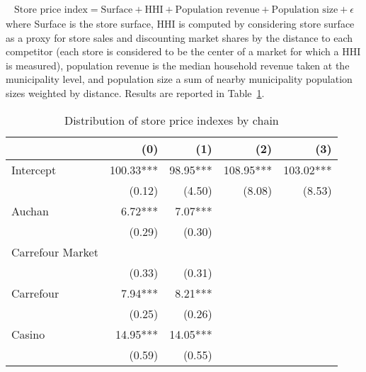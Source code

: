 \documentclass[english]{article}
\begin{document}
\begin{align}
\text{Store price index} = \text{Surface} + \text{HHI} + \text{Population revenue}+ \text{Population size}+ \epsilon
\label{reg_store_indexes}
\end{align}
where Surface is the store surface, HHI is computed by considering store surface as a proxy for store sales and discounting market shares by the distance to each competitor (each store is considered to be the center of a market for which a HHI is measured), population revenue is the median household revenue taken at the municipality level, and population size a sum of nearby municipality population sizes weighted by distance. Results are reported in Table~\ref{tab:reg_store_price_indexes}.

\begin{table}[H]
\caption{Distribution of store price indexes by chain}
\label{tab:reg_store_price_indexes}
\begin{threeparttable}
\renewcommand{\arraystretch}{0.7}%
\small
\begin{tabular}{lrrrr}
\toprule
\toprule
                                                        & (0)       & (1)      & (2)       & (3)        \\
\midrule
Intercept                                               & 100.33*** & 98.95*** & 108.95*** & 103.02***  \\
                                                        & (0.12)    & (4.50)   & (8.08)    & (8.53)     \\
Auchan                                                  & 6.72***   & 7.07***  &           &            \\
                                                        & (0.29)    & (0.30)   &           &            \\
Carrefour Market                                        &            \\
                                                        & (0.33)    & (0.31)   &           &            \\
Carrefour                                               & 7.94***   & 8.21***  &           &            \\
                                                        & (0.25)    & (0.26)   &           &            \\
Casino                                                  & 14.95***  & 14.05*** &           &            \\
                                                        & (0.59)    & (0.55)   &           &            \\

\end{tabular}
\end{threeparttable}
\end{table}
\end{document}
